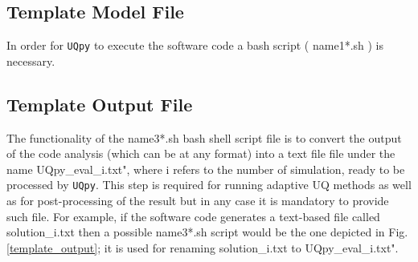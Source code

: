 \subsection{Template Model File}

In order for \texttt{UQpy}  to execute the software code a bash script ({\color{red} name1*.sh} ) is necessary.  


\begin{figure}[!ht]
	\caption{}
	\label{template_model}
\end{figure}



\subsection{Template Output File}

The functionality of the {\color{red} name3*.sh} bash shell script file is to convert the output of the code analysis (which can be at any format) into a text file file under the name {\color{magenta} UQpy\_eval\_i.txt"}, where {\color{magenta} i} refers to the number of simulation,  ready to be processed by \texttt{UQpy}. This step is required for running adaptive UQ methods as well as for post-processing of the result but in any case it is mandatory to provide such file. For example, if the software code generates a text-based  file called {\color{magenta} solution\_i.txt} then a possible {\color{red} name3*.sh} script would be the one depicted in Fig.\ref{template_output};  it is used for renaming {\color{magenta} solution\_i.txt} to {\color{magenta} UQpy\_eval\_i.txt"}.


